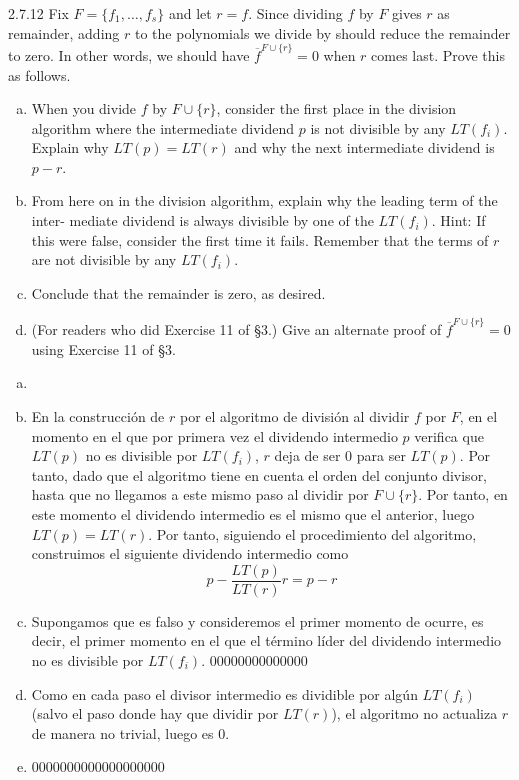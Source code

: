 \documentclass[twoside]{article}
\begin{document}
\newpage

\begin{ejercicio}{2.7.12}
Fix $F = \{ f_1 , \dots , f_s \}$ and let $r = f$. Since dividing $f$ by $F$ gives $r$ as remainder, adding
$r$ to the polynomials we divide by should reduce the remainder to zero. In other words,
we should have $\overline{f}^{F∪\{r\}}
= 0$ when $r$ comes last. Prove this as follows.
\begin{enumerate}[a.]
\item When you divide $f$ by $F ∪\{r\}$, consider the first place in the division algorithm where
the intermediate dividend $p$ is not divisible by any $LT ( f_i )$. Explain why $LT (p) =
LT (r)$ and why the next intermediate dividend is $p − r$.
\item From here on in the division algorithm, explain why the leading term of the inter-
mediate dividend is always divisible by one of the $LT ( f_i )$. Hint: If this were false,
consider the first time it fails. Remember that the terms of $r$ are not divisible by any
$LT ( f_i )$.
\item Conclude that the remainder is zero, as desired.
\item (For readers who did Exercise 11 of §3.) Give an alternate proof of $\overline{f}^{F∪\{r\}}
= 0$ using
Exercise 11 of §3.
\end{enumerate}
\end{ejercicio}
\begin{solucion}
\begin{enumerate}[a.]
\item[]
\item En la construcción de $r$ por el algoritmo de división al dividir $f$ por $F$, en el momento en el que por primera vez el dividendo intermedio $p$ verifica que $LT(p)$ no es divisible por $LT(f_i)$, $r$ deja de ser $0$ para ser $LT(p)$.  Por tanto, dado que el algoritmo tiene en cuenta el orden del conjunto divisor, hasta que no llegamos a este mismo paso al dividir por $F\cup\{r\}$. Por tanto, en este momento el dividendo intermedio es el mismo que el anterior, luego $LT(p)=LT(r)$. Por tanto, siguiendo el procedimiento del algoritmo, construimos el siguiente dividendo intermedio como 
$$
p-\frac{LT(p)}{LT(r)}r=p-r
$$
\item Supongamos que es falso y consideremos el primer momento de ocurre, es decir, el primer momento en el que el término líder del dividendo intermedio no es divisible por $LT(f_i)$. 00000000000000
\item Como en cada paso el divisor intermedio es dividible por algún $LT(f_i)$ (salvo el paso donde hay que dividir por $LT(r)$), el algoritmo no actualiza $r$ de manera no trivial, luego es $0$.
\item 0000000000000000000
\end{enumerate}
\end{solucion}
\end{document}
